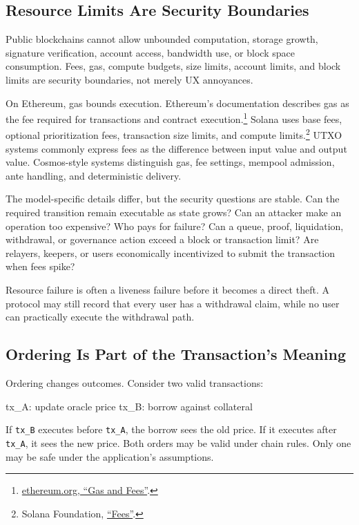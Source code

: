 \subsection{Resource Limits Are Security Boundaries}

Public blockchains cannot allow unbounded computation, storage growth, signature verification, account access, bandwidth use, or block space consumption. Fees, gas, compute budgets, size limits, account limits, and block limits are security boundaries, not merely UX annoyances.

On Ethereum, gas bounds execution. Ethereum's documentation describes gas as the fee required for transactions and contract execution.\footnote{\href{https://ethereum.org/developers/docs/gas/}{ethereum.org, ``Gas and Fees''}.} Solana uses base fees, optional prioritization fees, transaction size limits, and compute limits.\footnote{Solana Foundation, \href{https://solana.com/docs/core/fees}{``Fees''}.} UTXO systems commonly express fees as the difference between input value and output value. Cosmos-style systems distinguish gas, fee settings, mempool admission, ante handling, and deterministic delivery.

The model-specific details differ, but the security questions are stable. Can the required transition remain executable as state grows? Can an attacker make an operation too expensive? Who pays for failure? Can a queue, proof, liquidation, withdrawal, or governance action exceed a block or transaction limit? Are relayers, keepers, or users economically incentivized to submit the transaction when fees spike?

Resource failure is often a liveness failure before it becomes a direct theft. A protocol may still record that every user has a withdrawal claim, while no user can practically execute the withdrawal path.

\subsection{Ordering Is Part of the Transaction's Meaning}

Ordering changes outcomes. Consider two valid transactions:

\begin{codeblock}
tx_A: update oracle price
tx_B: borrow against collateral
\end{codeblock}

If \texttt{tx\_B} executes before \texttt{tx\_A}, the borrow sees the old price. If it executes after \texttt{tx\_A}, it sees the new price. Both orders may be valid under chain rules. Only one may be safe under the application's assumptions.


